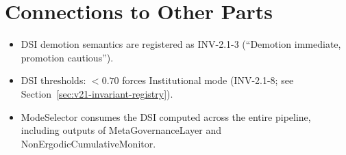 
\section*{Connections to Other Parts}

\begin{itemize}
\item DSI demotion semantics are registered as INV-2.1-3
(``Demotion immediate, promotion cautious'').
\item DSI thresholds: $< 0.70$ forces Institutional mode (INV-2.1-8;
see Section~\ref{sec:v21-invariant-registry}).
\item ModeSelector consumes the DSI computed across the entire
pipeline, including outputs of MetaGovernanceLayer and
NonErgodicCumulativeMonitor.
\end{itemize}
